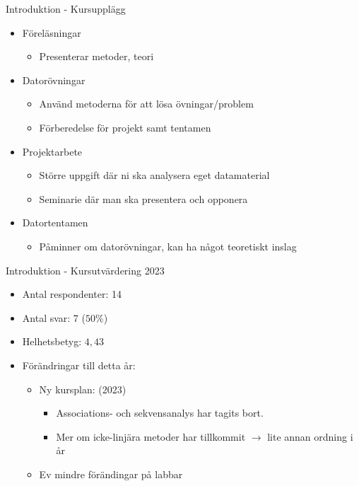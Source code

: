 \documentclass[10pt,english]{beamer}
\begin{document}
\begin{frame}{Introduktion - Kursupplägg}
    \begin{itemize}
        \item Föreläsningar
        \begin{itemize}
            \item Presenterar metoder, teori
        \end{itemize}
        \item Datorövningar
        \begin{itemize}
            \item Använd metoderna för att lösa övningar/problem
            \item Förberedelse för projekt samt tentamen
        \end{itemize}
        \item Projektarbete
        \begin{itemize}
            \item Större uppgift där ni ska analysera eget datamaterial
            \item Seminarie där man ska presentera och opponera
        \end{itemize}
        \item Datortentamen
        \begin{itemize}
            \item Påminner om datorövningar, kan ha något teoretiskt inslag
        \end{itemize}
    \end{itemize}
    
\end{frame}

\begin{frame}{Introduktion - Kursutvärdering 2023}
    \begin{itemize}
        \item Antal respondenter: 14
        \item Antal svar: 7 ($50\%$)
        \item Helhetsbetyg: $4,43$
        \item Förändringar till detta år:
        \begin{itemize}
            \item Ny kursplan: (2023)
            \begin{itemize}
                \item Associations- och sekvensanalys har tagits bort.
                \item Mer om icke-linjära metoder har tillkommit $\rightarrow$ lite annan ordning i år
            \end{itemize}
            \item Ev mindre förändingar på labbar
        \end{itemize}
    \end{itemize}
\end{frame}
\end{document}

